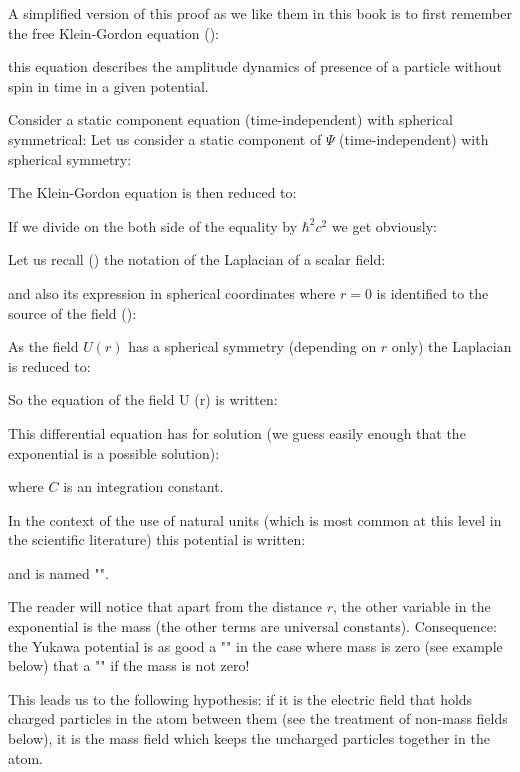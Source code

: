 	A simplified version of this proof as we like them in this book is to first remember the free Klein-Gordon equation ():
	
	this equation describes the amplitude dynamics of presence of a particle without spin in time in a given potential.
	
	Consider a static component equation (time-independent) with spherical symmetrical:
	Let us consider a static component of $\Psi$ (time-independent) with spherical symmetry:
	
	The Klein-Gordon equation is then reduced to:
	
	If we divide on the both side of the equality by $\hbar^2 c^2$ we get obviously:
	
	Let us recall () the notation of the Laplacian of a scalar field:
	
	and also its expression in spherical coordinates where $r=0$ is identified to the source of the field ():
	
	As the field $U(r)$ has a spherical symmetry  (depending on $r$ only) the Laplacian is reduced to:
	
	So the equation of the field U (r) is written:
	
	This differential equation has for solution (we guess easily enough that the exponential is a possible solution):
	
	where $C$ is an integration constant.
	
	In the context of the use of natural units (which is most common at this level in the scientific literature) this potential is written:
	
	and is named "\label{yukawa potential}".

	The reader will notice that apart from the distance $r$, the other variable in the exponential is the mass (the other terms are universal constants). Consequence: the Yukawa potential is as good a "" in the case where mass is zero (see example below) that a "" if the mass is not zero!
	
	This leads us to the following hypothesis: if it is the electric field that holds charged particles in the atom between them (see the treatment of non-mass fields below), it is the mass field which keeps the uncharged particles together in the atom.


